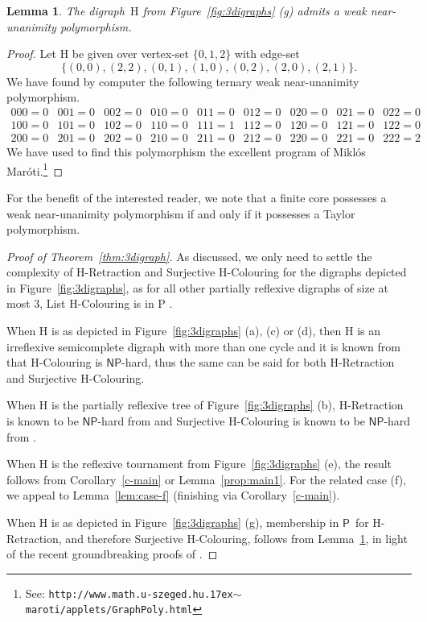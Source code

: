\documentclass[a4paper,12pt]{article}
\newtheorem{lemma}{Lemma}
\theoremstyle{remark}
\newcommand{\NP}[0]{\ensuremath{\mathsf{NP}}}
\newcommand{\Ptime}[0]{\ensuremath{\mathsf{P}}}
\renewcommand{\H}{\ensuremath{\mathrm{H}}}
\begin{document}
\begin{lemma}
The digraph~$\H$ from Figure~\ref{fig:3digraphs} (g) admits a weak near-unanimity polymorphism.
\label{lem:case-g}
\end{lemma}
\begin{proof}
Let $\H$ be given over vertex-set $\{0,1,2\}$ with edge-set 
\[\{(0,0), (2,2), (0,1), (1,0), (0,2), (2,0), (2,1)\}.\]
We have found by computer the following ternary weak near-unanimity polymorphism.
\[
\begin{array}{ccccccccc}
000=0 &
001=0 &
002=0 &
010=0 &
011=0 &
012=0 &
020=0 &
021=0 &
022=0 
\\
100=0 &
101=0 &
102=0 &
110=0 &
111=1 &
112=0 &
120=0 &
121=0 &
122=0 
\\
200=0 &
201=0 &
202=0 &
210=0 &
211=0 &
212=0 &
220=0 &
221=0 &
222=2
\end{array}
\]
We have used to find this polymorphism the excellent program of Mikl\'os Mar\'oti.\footnote{See: \texttt{http://www.math.u-szeged.hu{\raise.17ex\hbox{$\scriptstyle\sim$}}maroti/applets/GraphPoly.html}}
\end{proof}
For the benefit of the interested reader, we note that a finite core possesses a weak near-unanimity polymorphism if and only if it possesses a Taylor polymorphism.
\begin{proof}[Proof of Theorem~\ref{thm:3digraph}]
As discussed, we only need to settle the complexity of {\sc $\H$-Retraction} and {\sc Surjective $\H$-Colouring} for the digraphs depicted in Figure~\ref{fig:3digraphs}, as for all other partially reflexive digraphs of size at most $3$, {\sc List $\H$-Colouring} is in P \cite{FederHellTucker}.

When $\H$ is as depicted in Figure~\ref{fig:3digraphs} (a), (c) or (d), then $\H$ is an irreflexive semicomplete digraph with more than one cycle and it is known from \cite{Semicomplete} that {\sc $\H$-Colouring} is \NP-hard, thus the same can be said for both {\sc $\H$-Retraction} and {\sc Surjective $\H$-Colouring}.

When $\H$ is the partially reflexive tree of Figure~\ref{fig:3digraphs} (b), {\sc $\H$-Retraction} is known to be \NP-hard from \cite{pseudoforests} and {\sc Surjective $\H$-Colouring} is known to be \NP-hard from \cite{GolovachPS12}.

When $\H$ is the reflexive tournament from Figure~\ref{fig:3digraphs} (e), the result follows from Corollary~\ref{c-main} or Lemma~\ref{prop:main1}. For the related case (f), we appeal to Lemma~\ref{lem:case-f} (finishing via Corollary~\ref{c-main}).

When $\H$ is as depicted in Figure~\ref{fig:3digraphs} (g), membership in \Ptime\ for {\sc $\H$-Retraction}, and therefore {\sc Surjective $\H$-Colouring}, follows from Lemma~\ref{lem:case-g}, in light of the recent groundbreaking proofs of \cite{FVproofBulatov,FVproofZhuk}.
\end{proof}
\end{document}
